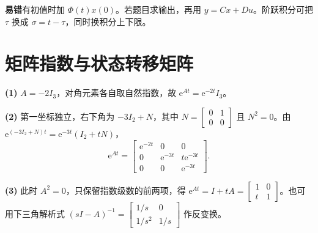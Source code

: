 \noindent\textbf{易错}\quad 有初值时加 $\Phi(t)x(0)$。若题目求输出，再用 $y=Cx+Du$。阶跃积分可把 $\tau$ 换成 $\sigma=t-\tau$，同时换积分上下限。

\section{矩阵指数与状态转移矩阵}



\sol \textbf{(1)} $A=-2I_3$，对角元素各自取自然指数，故 $\mathrm e^{At}=\mathrm e^{-2t}I_3$。

\textbf{(2)} 第一坐标独立，右下角为 $-3I_2+N$，其中 $N=\begin{bmatrix}0&1\\0&0\end{bmatrix}$ 且 $N^2=0$。由 $\mathrm e^{(-3I_2+N)t}=\mathrm e^{-3t}(I_2+tN)$，
\[
\mathrm e^{At}=\begin{bmatrix}
\mathrm e^{-2t}&0&0\\
0&\mathrm e^{-3t}&t\mathrm e^{-3t}\\
0&0&\mathrm e^{-3t}
\end{bmatrix}.
\]

\textbf{(3)} 此时 $A^2=0$，只保留指数级数的前两项，得 $\mathrm e^{At}=I+tA=\begin{bmatrix}1&0\\ t&1\end{bmatrix}$。也可用下三角解析式 $(sI-A)^{-1}=\begin{bmatrix}1/s&0\\1/s^2&1/s\end{bmatrix}$ 作反变换。

